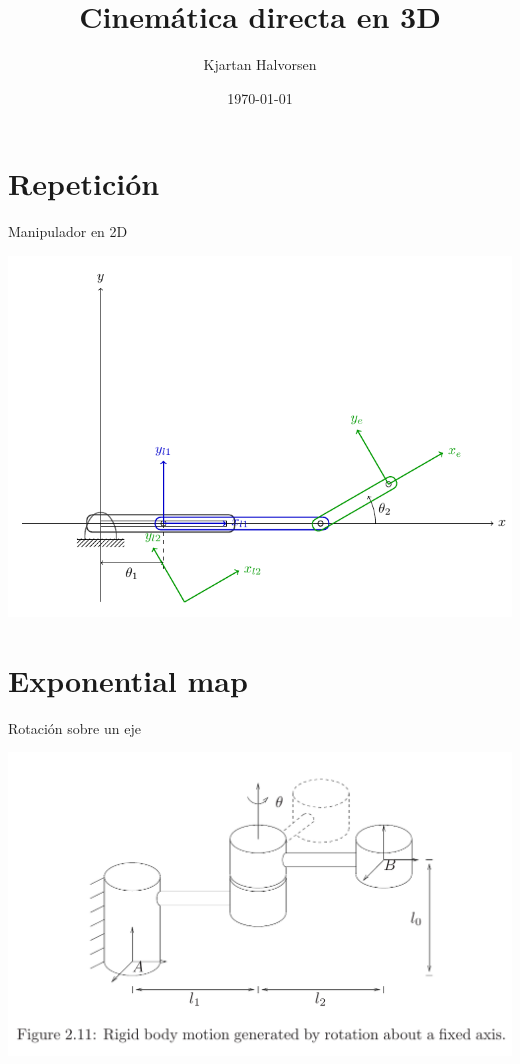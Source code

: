 \documentclass[presentation,aspectratio=169]{beamer}
\author{Kjartan Halvorsen}
\date{\today}
\title{Cinemática directa en 3D}
\begin{document}
\maketitle

\section{Repetición}
\label{sec:org4b1e7bb}
\begin{frame}[label={sec:org23a0d08}]{Manipulador en 2D}
\begin{center}
 \includegraphics[height=0.8\textheight]{../figures/2d-2dof-prismatic-revolute.pdf}
\end{center}
\end{frame}

\section{Exponential map}
\label{sec:org2f5fd61}

\begin{frame}[label={sec:orgd94ebd3}]{Rotación sobre un eje}
\begin{center}
 \includegraphics[height=0.8\textheight]{../figures/MLS-fig2.11.png}
\end{center}
\end{frame}
\end{document}
